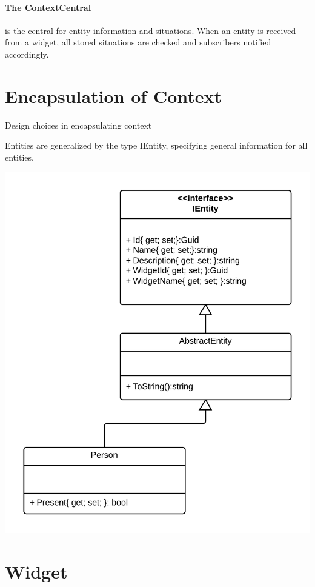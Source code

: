 \documentclass[]{report}
\begin{document}
\paragraph{The ContextCentral} is the central for entity information and situations. When an entity is received from a widget, all stored situations are checked and subscribers notified accordingly.



\section{Encapsulation of Context}
Design choices in encapsulating context

Entities are generalized by the type IEntity, specifying general information for all entities.


\begin{center}
\includegraphics[scale=0.15]{ContextClassDiagram.png}
\end{center}


\section{Widget}
\end{document}
